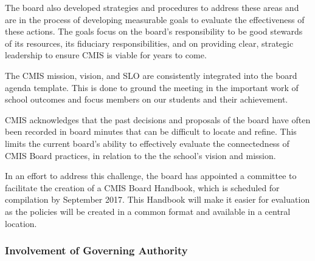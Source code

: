 \begin{findings}
The board also developed strategies and procedures to address these areas and are in the process of developing measurable goals to evaluate the effectiveness of these actions. The goals focus on the board’s responsibility to be good stewards of its resources, its fiduciary responsibilities, and on providing clear, strategic leadership to ensure CMIS is viable for years to come.

The CMIS mission, vision, and SLO are consistently integrated into the board agenda template. This is done to ground the meeting in the important work of school outcomes and focus members on our students and their achievement. 


CMIS acknowledges that the past decisions and proposals of the board have often been recorded in board minutes that can be difficult to locate and refine. This limits the current board’s ability to effectively evaluate the connectedness of CMIS Board practices, in relation to the the school’s vision and mission.

In an effort to address this challenge, the board has appointed a committee to facilitate the creation of a CMIS Board Handbook, which is scheduled for compilation by September 2017. This Handbook will make it easier for evaluation as the policies will be created in a common format and available in a central location. 
\end{findings}

\subsubsection{Involvement of Governing Authority}



